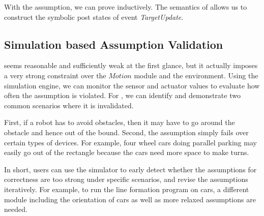 With the assumption, we can prove  inductively.
The \K semantics of \lgname allows us to construct the symbolic post states of event \emph{TargetUpdate}.


\begin{figure}
\end{figure}


\subsection{Simulation based Assumption Validation}

 seems reasonable and sufficiently weak at the first glance,
but it actually imposes a very strong constraint over the $Motion$ module and the environment.
Using the simulation engine, we can monitor the sensor and actuator values to evaluate how often the assumption is violated.
For , we can identify and demonstrate two common scenarios
where it is invalidated.


First, if a robot has to avoid obstacles,
then it may have to go around the obstacle and hence out of the bound.
Second, the assumption simply fails over certain types of devices.
For example, four wheel cars doing parallel parking may easily go out of the rectangle
because the cars need more space to make turns.

In short, users can use the simulator to early detect whether
the assumptions for correctness are too strong under specific scenarios,
and revise the assumptions iteratively.
For example, to run the line formation program on cars,
a different module including the orientation of cars as well as more relaxed assumptions are needed.
